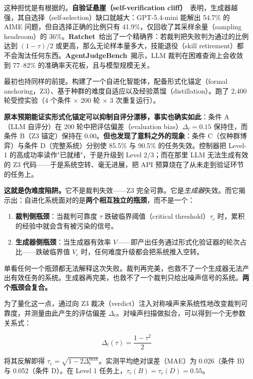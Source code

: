 \documentclass{article}
\begin{document}
这种担忧是有根据的。\textbf{自验证悬崖（self-verification cliff）}~\cite{self_verification_cliff}表明，生成器越强，其自选择（self-selection）缺口就越大：GPT-5.4-mini 能解出 54.7\% 的 AIME 问题，但自选择正确的比例只有 41.9\%，仅回收了其采样余量（sampling headroom）的 36\%。\textbf{Ratchet}~\cite{ratchet}给出了一个精确界：若裁判把失败判为通过的比例达到 $(1-\tau)/2$ 或更高，那么无论样本量多大，技能退役（skill retirement）都不会淘汰任何东西。\textbf{AgentJudgeBench}~\cite{agentjudgebench}揭示，LLM 裁判在困难查询上会收敛到 77--82\% 的准确率天花板，且与模型规模无关。

最初也持同样的前提。构建了一个自进化智能体，配备形式化锚定（formal anchoring，Z3）、基于种群的难度自适应以及经验蒸馏（distillation）。跑了 2,400 轮受控实验（4 个条件 $\times$ 200 轮 $\times$ 3 次重复运行）。

\textbf{原本预期能证实形式化锚定可以抑制自评分漂移，事实也确实如此}：条件 A（LLM 自评分）在 200 轮中把评估偏差（evaluation bias）$\Delta_t = 0.15$ 保持住，而条件 B（Z3 锚定）保持在 $0.00$。\textbf{但也发现了意料之外的现象}：条件 C（仅种群博弈）与条件 D（完整系统）分别使 85.5\% 与 90.5\% 的任务失效。控制器把 Level-1 的高成功率读作"已就绪"，于是升级到 Level 2/3；而在那里 LLM 无法生成有效的 Z3 代码——于是系统空转、毫无进展，把 API 预算烧在了从未走到验证环节的任务上。

\textbf{这就是伪难度陷阱。}它不是裁判失效——Z3 完全可靠。它是\textit{生成器}失效。而它揭示出：自进化系统面对的是\textbf{两个相互独立的瓶颈}，而不是一个：

\begin{enumerate}
  \item \textbf{裁判侧瓶颈}：当裁判可靠度 $\tau$ 跌破临界阈值（critical threshold）$\tau_c$ 时，累积的经验中就会含有被污染的信号。
  \item \textbf{生成器侧瓶颈}：当生成器有效率 $V$——即产出任务通过形式化验证器的轮次占比——跌破临界值 $V_c$ 时，任何难度升级都会把系统推入空转。
\end{enumerate}

单看任何一个瓶颈都无法解释这次失败。裁判再完美，也救不了一个生成器无法产出有效任务的系统。生成器再完美，也救不了一个裁判只给出噪声信号的系统。\textbf{两个瓶颈会复合。}

为了量化这一点，通过向 Z3 裁决（verdict）注入对称噪声来系统性地改变裁判可靠度，并测量由此产生的评估偏差 $\Delta_t$。对噪声扫描做拟合，可以得到一个无参数关系式：

\[
  \Delta_t(\tau) = \frac{1-\tau^2}{2}
\]

将其反解即得 $\tau_c = \sqrt{1 - 2\Delta_t^{\max}}$。实测平均绝对误差（MAE）为 0.026（条件 B）与 0.052（条件 D）。在 Level 1 任务上，$\tau_c(B) = \tau_c(D) = 0.55$。
\end{document}
